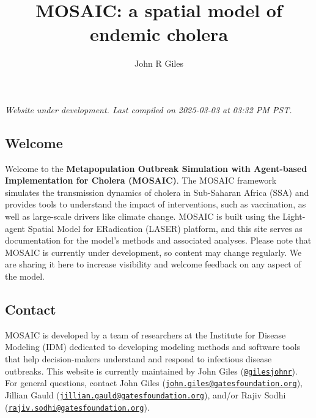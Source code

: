 \documentclass[
]{book}
\title{MOSAIC: a spatial model of endemic cholera}
\author{John R Giles}
\date{}
\begin{document}
\maketitle

{
\setcounter{tocdepth}{1}
\tableofcontents
}
\chapter*{}\label{section}

\hfill\break

{\emph{
Website under development. Last compiled on 2025-03-03 at 03:32 PM PST.
}}

\section*{Welcome}\label{welcome}

Welcome to the \textbf{Metapopulation Outbreak Simulation with Agent-based Implementation for Cholera (MOSAIC)}. The MOSAIC framework simulates the transmission dynamics of cholera in Sub-Saharan Africa (SSA) and provides tools to understand the impact of interventions, such as vaccination, as well as large-scale drivers like climate change. MOSAIC is built using the Light-agent Spatial Model for ERadication (LASER) platform, and this site serves as documentation for the model's methods and associated analyses. Please note that MOSAIC is currently under development, so content may change regularly. We are sharing it here to increase visibility and welcome feedback on any aspect of the model.

\section*{Contact}\label{contact}

MOSAIC is developed by a team of researchers at the Institute for Disease Modeling (IDM) dedicated to developing modeling methods and software tools that help decision-makers understand and respond to infectious disease outbreaks. This website is currently maintained by John Giles (\href{https://github.com/gilesjohnr}{\texttt{@gilesjohnr}}). For general questions, contact John Giles (\href{mailto:john.giles@gatesfoundation.org}{\nolinkurl{john.giles@gatesfoundation.org}}), Jillian Gauld (\href{mailto:jillian.gauld@gatesfoundation.org}{\nolinkurl{jillian.gauld@gatesfoundation.org}}), and/or Rajiv Sodhi (\href{mailto:rajiv.sodhi@gatesfoundation.org}{\nolinkurl{rajiv.sodhi@gatesfoundation.org}}).
\end{document}
